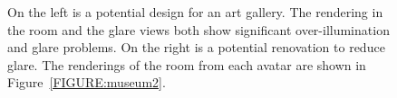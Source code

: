 \documentclass[10pt,twocolumn,letterpaper]{article}
\begin{document}
\begin{figure}[t]
\begin{center}
\vspace{-0.1in}
\end{center}
\caption{ On the left is a potential design for an art gallery.  The
  rendering in the room and the glare views both show significant
  over-illumination and glare problems.  On the right is a potential
  renovation to reduce glare. The renderings of the room from each
  avatar are shown in Figure~\ref{FIGURE:museum2}.}
%
%
\label{FIGURE:editing_model}
\end{figure}
\end{document}
